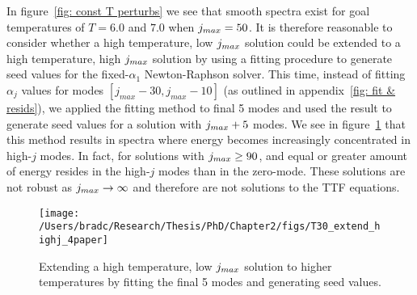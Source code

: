 \documentclass[../PhD.tex]{subfiles}
\begin{document}
In figure~\ref{fig: const T perturbs} we see that smooth spectra exist for goal temperatures of $T=6.0$ and $7.0$ when $j_{max} = 50$. It is therefore reasonable to consider whether a high temperature, low $j_{max}$ solution could be extended to a high temperature, high $j_{max}$ solution by using a fitting procedure to generate seed values for the fixed-$\alpha_1$ Newton-Raphson solver. This time, instead of fitting $\alpha_j$ values for modes ${[ j_{max} - 30, j_{max} - 10 ]}$ (as outlined in appendix~\ref{fig: fit & resids}), we applied the fitting method to final 5 modes and used the result to generate seed values for a solution with $j_{max} + 5$ modes. We see in figure~\ref{fig: manual highT} that this method results in spectra where energy becomes increasingly concentrated in high-$j$ modes. In fact, for solutions with $j_{max} \geq 90$, and equal or greater amount of energy resides in the high-$j$ modes than in the zero-mode. These solutions are not robust as $j_{max} \to \infty$ and therefore are not solutions to the TTF equations.

\begin{figure}[ht]
	\centering
	\texttt{[image: /Users/bradc/Research/Thesis/PhD/Chapter2/figs/T30\_extend\_highj\_4paper]}
	\caption[Constructing high temperature solutions by hand]{Extending a high temperature, low $j_{max}$ solution to higher temperatures by fitting the final 5 modes and generating seed values.}
	\label{fig: manual highT}
\end{figure}
\end{document}
